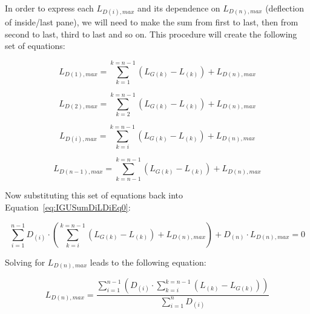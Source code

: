 In order to express each \({L_{D\left( i \right),max}}\) and its dependence on \({L_{D\left( n \right),max}}\) (deflection of inside/last pane), we will need to make the sum from first to last, then from second to last, third to last and so on. This procedure will create the following set of equations:

\begin{equation}
{L_{D\left( 1 \right),max}} = \mathop \sum \limits_{k = 1}^{k = n - 1} \left( {{L_{G\left( k \right)}} - {L_{\left( k \right)}}} \right) + {L_{D\left( n \right),max}}
\label{eq:IGULD1max}
\end{equation}

\begin{equation}
{L_{D\left( 2 \right),max}} = \mathop \sum \limits_{k = 2}^{k = n - 1} \left( {{L_{G\left( k \right)}} - {L_{\left( k \right)}}} \right) + {L_{D\left( n \right),max}}
\end{equation}

\begin{equation}
{L_{D\left( i \right),max}} = \mathop \sum \limits_{k = i}^{k = n - 1} \left( {{L_{G\left( k \right)}} - {L_{\left( k \right)}}} \right) + {L_{D\left( n \right),max}}
\end{equation}

\begin{equation}
{L_{D\left( {n - 1} \right),max}} = \mathop \sum \limits_{k = n - 1}^{k = n - 1} \left( {{L_{G\left( k \right)}} - {L_{\left( k \right)}}} \right) + {L_{D\left( n \right),max}}
\label{eq:IGULDn-1max}
\end{equation}

Now substituting this set of equations back into Equation~\ref{eq:IGUSumDiLDiEq0}:

\begin{equation}
\mathop \sum \limits_{i = 1}^{n - 1} {D_{\left( i \right)}}\cdot \left( {\mathop \sum \limits_{k = i}^{k = n - 1} \left( {{L_{G\left( k \right)}} - {L_{\left( k \right)}}} \right) + {L_{D\left( n \right),max}}} \right) + {D_{\left( n \right)}}\cdot {L_{D\left( n \right),max}} = 0
\end{equation}

Solving for \({L_{D\left( n \right),max}}\) leads to the following equation:

\begin{equation}
{L_{D\left( n \right),max}} = \frac{{\mathop \sum \nolimits_{i = 1}^{n - 1} ({D_{\left( i \right)}}\cdot \mathop \sum \nolimits_{k = i}^{k = n - 1} \left( {{L_{\left( k \right)}} - {L_{G\left( k \right)}}} \right))}}{{\mathop \sum \nolimits_{i = 1}^n {D_{\left( i \right)}}}}
\end{equation}

